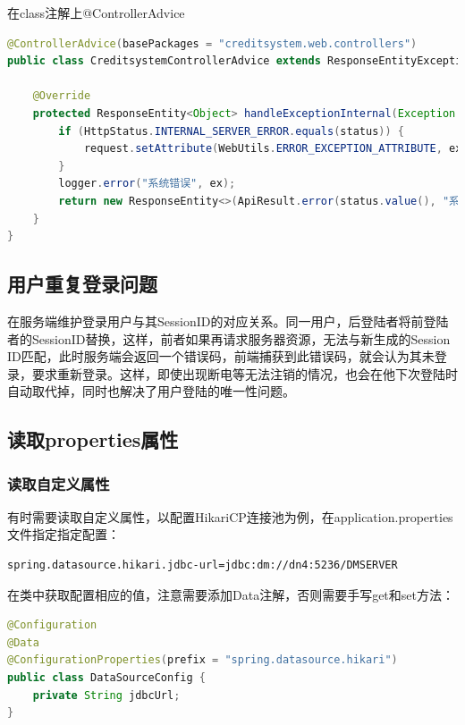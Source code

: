 \documentclass[letter]{book}
\begin{document}
在class注解上@ControllerAdvice

\begin{lstlisting}[language=Java]
@ControllerAdvice(basePackages = "creditsystem.web.controllers")
public class CreditsystemControllerAdvice extends ResponseEntityExceptionHandler {

	@Override
	protected ResponseEntity<Object> handleExceptionInternal(Exception ex, Object body, HttpHeaders headers, HttpStatus status, WebRequest request) {
		if (HttpStatus.INTERNAL_SERVER_ERROR.equals(status)) {
			request.setAttribute(WebUtils.ERROR_EXCEPTION_ATTRIBUTE, ex, WebRequest.SCOPE_REQUEST);
		}
		logger.error("系统错误", ex);
		return new ResponseEntity<>(ApiResult.error(status.value(), "系统错误"), headers, HttpStatus.OK);
	}
}
\end{lstlisting}

\subsection{用户重复登录问题}

在服务端维护登录用户与其SessionID的对应关系。同一用户，后登陆者将前登陆者的SessionID替换，这样，前者如果再请求服务器资源，无法与新生成的Session ID匹配，此时服务端会返回一个错误码，前端捕获到此错误码，就会认为其未登录，要求重新登录。这样，即使出现断电等无法注销的情况，也会在他下次登陆时自动取代掉，同时也解决了用户登陆的唯一性问题。

\subsection{读取properties属性}

\subsubsection{读取自定义属性}

有时需要读取自定义属性，以配置HikariCP连接池为例，在application.properties文件指定指定配置：

\begin{lstlisting}
spring.datasource.hikari.jdbc-url=jdbc:dm://dn4:5236/DMSERVER
\end{lstlisting}

在类中获取配置相应的值，注意需要添加Data注解，否则需要手写get和set方法：

\begin{lstlisting}[language=Java]
@Configuration
@Data
@ConfigurationProperties(prefix = "spring.datasource.hikari")
public class DataSourceConfig {
	private String jdbcUrl;
}
\end{lstlisting}
\end{document}

